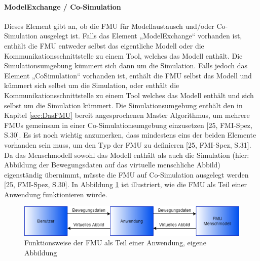 \paragraph{ModelExchange / Co-Simulation}\label{sec:ModellExchangeCoSimulation}
\noindent Dieses Element gibt an, ob die FMU für Modellaustausch und/oder Co-Simulation ausgelegt ist.
Falls das Element „ModelExchange“ vorhanden ist, enthält die FMU entweder selbst das eigentliche Modell oder die Kommunikationsschnittstelle zu einem Tool, welches das Modell enthält. Die Simulationsumgebung kümmert sich dann um die Simulation.
Falls jedoch das Element „CoSimulation“ vorhanden ist, enthält die FMU selbst das Modell und kümmert sich selbst um die Simulation, oder enthält die Kommunikationsschnittstelle zu einem Tool welches das Modell enthält und sich selbst um die Simulation kümmert. Die Simulationsumgebung enthält den in Kapitel \ref*{sec:DasFMU} bereit angesprochenen Master Algorithmus, um mehrere FMUs gemeinsam in einer Co-Simulationsumgebung einzusetzen  [25, FMI-Spez, S.30].
Es ist noch wichtig anzumerken, dass mindestens eins der beiden Elemente vorhanden sein muss, um den Typ der FMU zu definieren [25, FMI-Spez, S.31].
Da das Menschmodell sowohl das Modell enthält als auch die Simulation (hier: Abbildung der Bewegungsdaten auf das virtuelle menschliche Abbild) eigenständig übernimmt, müsste die FMU auf Co-Simulation ausgelegt werden [25, FMI-Spez, S.30].
\newline
In Abbildung \ref{fig:FMUCoSimulation} ist illustriert, wie die FMU als Teil einer Anwendung funktionieren würde.
\begin{figure}[h]
	\centering
	\includegraphics[width=1\linewidth]{Bilder/A23_FMUCoSimulation}
	\caption{Funktionsweise der FMU als Teil einer Anwendung, eigene Abbildung}
	\label{fig:FMUCoSimulation}
\end{figure}
%
%
